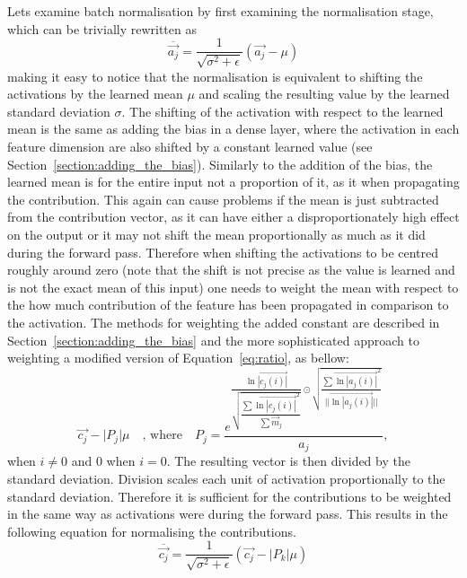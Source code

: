 Lets examine batch normalisation by first examining the normalisation stage, which can be trivially rewritten as
\begin{equation}
  \overline{\vec{a_j}}= \frac{1}{\sqrt{\sigma^2 +\epsilon}}(\vec{a_j}-\mu)
\end{equation}
making it easy to notice that the normalisation is equivalent to shifting the activations by the learned mean $\mu$ and scaling the resulting value by the learned standard deviation $\sigma$. The shifting of the activation with respect to the learned mean is the same as adding the bias in a dense layer, where the activation in each feature dimension are also shifted by a constant learned value (see Section~\ref{section:adding_the_bias}). Similarly to the addition of the bias, the learned mean is for the entire input not a proportion of it, as it when propagating the contribution. This again can cause problems if the mean is just subtracted from the contribution vector, as it can have either a disproportionately high effect on the output or it may not shift the mean proportionally as much as it did during the forward pass. Therefore when shifting the activations to be centred roughly around zero (note that the shift is not precise as the value is learned and is not the exact mean of this input) one needs to weight the mean with respect to the how much contribution of the feature has been propagated in comparison to the activation. The methods for weighting the added constant are described in Section~\ref{section:adding_the_bias} and the more sophisticated approach to weighting a modified version of Equation~\ref{eq:ratio}, as bellow:
\begin{equation}
\label{eq:Pj}
 \vec{c_j} - \big\lvert P_{j}\big\rvert\mu \quad \mbox{, where}\quad P_j = \dfrac{
e^{
\dfrac{\vec{\ln |c_j(i)|}}{\sqrt{\dfrac{\sum \vec{\ln |c_j(i)|}^2}{\sum \vec{m}_j}}} 
\odot
\sqrt{\dfrac{\sum \vec{\ln |a_j(i)|}^2}{||\vec{\ln|a_j(i)|}||}}
}
}{a_j}, 
\end{equation}
when $i \not= 0$ and 0 when $i = 0$.
The resulting vector is then divided by the standard deviation. Division scales each unit of
activation proportionally to the standard deviation. Therefore it is sufficient for the contributions to be
weighted in the same way as activations were during the forward pass. This results in the following equation for normalising the contributions.
\begin{equation}
 \overline{\vec{c_j}} = \frac{1}{\sqrt{\sigma^2 +\epsilon}}( \vec{c_j} - \big\lvert P_{k}\big\rvert\mu)
\end{equation}

